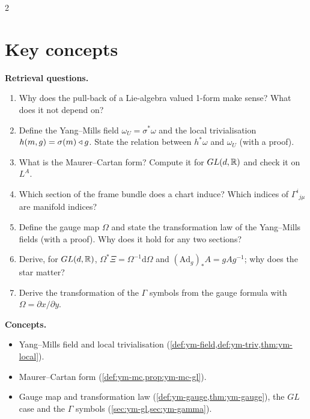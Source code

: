 \begin{paracol}{2}
\section*{Key concepts}
\begin{keyconcepts}
\textbf{Retrieval questions.}
\begin{enumerate}
  \item Why does the pull-back of a Lie-algebra valued 1-form make sense? What does it not depend on?
  \item Define the Yang--Mills field $\omega_U=\sigma^*\omega$ and the local trivialisation $h(m,g)=\sigma(m)\mathbin{\triangleleft} g$. State the relation between $h^*\omega$ and $\omega_U$ (with a proof).
  \item What is the Maurer--Cartan form? Compute it for $GL(d,\mathbb{R})$ and check it on $L^A$.
  \item Which section of the frame bundle does a chart induce? Which indices of $\Gamma^i{}_{j\mu}$ are manifold indices?
  \item Define the gauge map $\Omega$ and state the transformation law of the Yang--Mills fields (with a proof). Why does it hold for any two sections?
  \item Derive, for $GL(d,\mathbb{R})$, $\Omega^*\Xi=\Omega^{-1}\mathrm d\Omega$ and $(\mathrm{Ad}_g)_*A=gAg^{-1}$; why does the star matter?
  \item Derive the transformation of the $\Gamma$ symbols from the gauge formula with $\Omega=\partial x/\partial y$.
\end{enumerate}
\textbf{Concepts.}
\begin{itemize}
  \item Yang--Mills field and local trivialisation (\cref{def:ym-field,def:ym-triv,thm:ym-local}).
  \item Maurer--Cartan form (\cref{def:ym-mc,prop:ym-mc-gl}).
  \item Gauge map and transformation law (\cref{def:ym-gauge,thm:ym-gauge}), the $GL$ case and the $\Gamma$ symbols (\cref{sec:ym-gl,sec:ym-gamma}).
\end{itemize}
\end{keyconcepts}

\flushside
\end{paracol}
